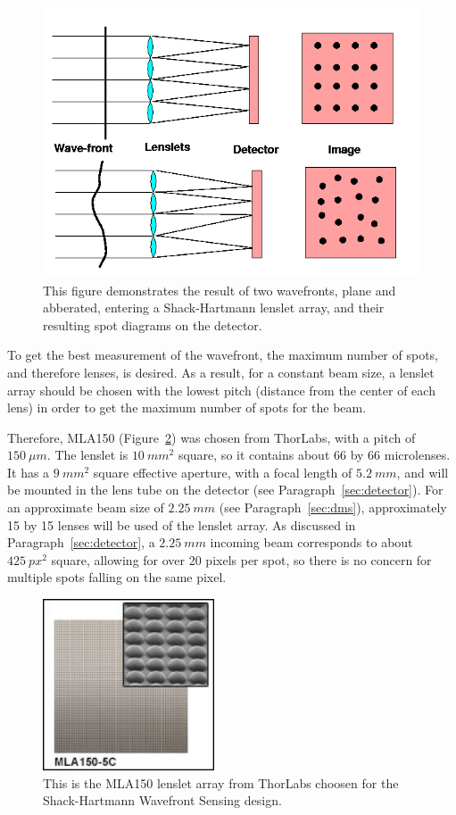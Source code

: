 \documentclass[12pt]{article}
\begin{document}
\begin{figure}[ht]
\centering
  \includegraphics[width=5in]{images/payload_SH.png}
\caption{This figure demonstrates the result of two wavefronts, plane and abberated, entering a Shack-Hartmann lenslet array, and their resulting spot diagrams on the detector.}
\label{fig:lenslet_array}
\end{figure}

To get the best measurement of the wavefront, the maximum number of spots, and therefore lenses, is desired. As a result, for a constant beam size, a lenslet array should be chosen with the lowest pitch (distance from the center of each lens) in order to get the maximum number of spots for the beam.


Therefore, MLA150 (Figure~\ref{fig:MLA150}) was chosen from ThorLabs, with a pitch of $150\ \mu m$.
The lenslet is $10\ mm^2$ square, so it contains about 66 by 66 microlenses. It has a $9\ mm^2$ square effective aperture, with a focal length of $5.2\ mm$, and will be mounted in the lens tube on the detector (see Paragraph~\ref{sec:detector}). For an approximate beam size of $2.25\ mm$ (see Paragraph~\ref{sec:dms}), approximately 15 by 15 lenses will be used of the lenslet array. As discussed in Paragraph~\ref{sec:detector}, a $2.25\ mm$ incoming beam corresponds to about $425\ px^2$ square, allowing for over 20 pixels per spot, so there is no concern for multiple spots falling on the same pixel. 

\begin{figure}[ht]
\centering
  \includegraphics[width=2in]{images/payload_MLA150.jpg}
\caption{This is the MLA150 lenslet array from ThorLabs choosen for the Shack-Hartmann Wavefront Sensing design.}
\label{fig:MLA150}
\end{figure}
\end{document}
